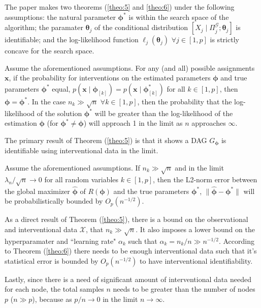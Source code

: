 \documentclass[twoside,11pt]{article}
\let\mc\mathcal
\let\mbf\mathbf
\begin{document}
The paper makes two theorems (\ref{theo:5} and \ref{theo:6}) under the following assumptions: the natural parameter $\bm\phi^{\ast}$ is within the search space of the algorithm; the paramater $\bm\theta_j$ of the conditional distribution $[X_j\mid\Pi_j^\mc{G};\bm\theta_j]$ is identifiable; and the log-likelihood function $\ell_j(\bm\theta_j)$ $\forall{j}\in[1,p]$ is strictly concave for the search space.

\renewcommand\thetheorem{5}
\begin{theorem}
\label{theo:5} Assume the aforementioned assumptions. For any (and all) possible assignments $\mbf{x}$, if the probability for interventions on the estimated parameters $\bm\phi$ and true parameters $\bm\phi^{\ast}$ equal, $p(\mbf x \mid \bm\phi_{[k]})=p(\mbf x \mid \bm\phi^{\ast}_{[k]})$ for all $k\in[1,p]$, then $\bm\phi=\bm\phi^{\ast}$. In the case $n_k \gg \sqrt{n}$ $\forall{k}\in[1,p]$, then the probability that the log-likelihood of the solution $\bm\phi^\ast$ will be greater than the log-likelihood of the estimation $\bm\phi$ (for $\bm\phi^\ast \neq \bm\phi$) will approach 1 in the limit as $n$ approaches $\infty$.
\end{theorem}

The primary result of Theorem (\ref{theo:5}) is that it shows a DAG $G_{\bm\phi}$ is identifiable using interventional data in the limit.

\renewcommand\thetheorem{6}
\begin{theorem}
\label{theo:6} Assume the aforementioned assumptions. If $n_k \gg \sqrt{n}$ and in the limit $\lambda_n / \sqrt{n} \rightarrow 0$ for all random variables $k\in[1,p]$, then the L2-norm error between the global maximizer $\hat{\bm\phi}$ of $R(\bm\phi)$ and the true parameters $\bm\phi^{\ast}$, $\lVert \hat{\bm\phi} - \bm\phi^{\ast}\rVert$ will be probabilistically bounded by $O_p(n^{-1/2})$.
\end{theorem}

As a direct result of Theorem (\ref{theo:5}), there is a bound on the observational and interventional data $\mc{X}$, that $n_k \gg \sqrt{n}$. It also imposes a lower bound on the hyperparamater and ``learning rate" $\alpha_k$ such that $\alpha_k=n_k/n\gg n^{-1/2}$. According to Theorem (\ref{theo:6}) there needs to be enough interventional data such that it's statistical error is bounded by $O_p(n^{-1/2})$ to have interventional identifiability. 

Lastly, since there is a need of significant amount of interventional data needed for each node, the total samples $n$ needs to be greater than the number of nodes $p$ ($n\gg p$), because as $p/n\rightarrow 0$ in the limit $n\rightarrow \infty$.
\end{document}
